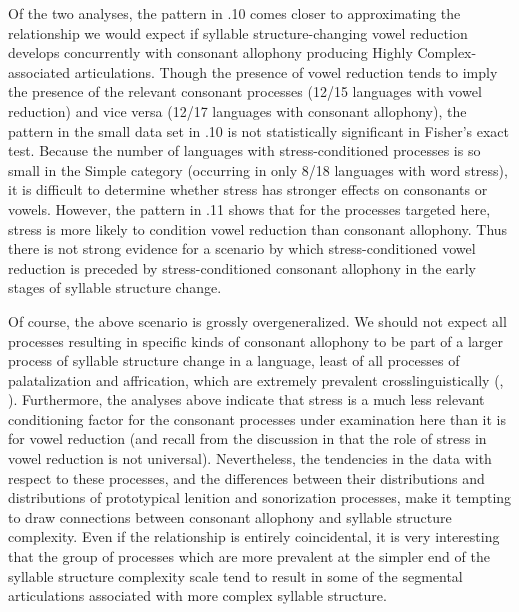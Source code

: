   Of the two analyses, the pattern in .10 comes closer to approximating the relationship we would expect if syllable structure-changing vowel reduction develops concurrently with consonant allophony producing Highly Complex-associated articulations. Though the presence of vowel reduction tends to imply the presence of the relevant consonant processes (12/15 languages with vowel reduction) and vice versa (12/17 languages with consonant allophony), the pattern in the small data set in .10 is not statistically significant in Fisher’s exact test. Because the number of languages with stress-conditioned processes is so small in the Simple category (occurring in only 8/18 languages with word stress), it is difficult to determine whether stress has stronger effects on consonants or vowels. However, the pattern in .11 shows that for the processes targeted here, stress is more likely to condition vowel reduction than consonant allophony. Thus there is not strong evidence for a scenario by which stress-conditioned vowel reduction is preceded by stress-conditioned consonant allophony in the early stages of syllable structure change.



  Of course, the above scenario is grossly overgeneralized. We should not expect all processes resulting in specific kinds of consonant allophony to be part of a larger process of syllable structure change in a language, least of all processes of palatalization and affrication, which are extremely prevalent crosslinguistically (\citealt{Bhat1978}, \citealt{Bateman2007}). Furthermore, the analyses above indicate that stress is a much less relevant conditioning factor for the consonant processes under examination here than it is for vowel reduction (and recall from the discussion in  that the role of stress in vowel reduction is not universal). Nevertheless, the tendencies in the data with respect to these processes, and the differences between their distributions and distributions of prototypical lenition and sonorization processes, make it tempting to draw connections between consonant allophony and syllable structure complexity. Even if the relationship is entirely coincidental, it is very interesting that the group of processes which are more prevalent at the simpler end of the syllable structure complexity scale tend to result in some of the segmental articulations associated with more complex syllable structure.




